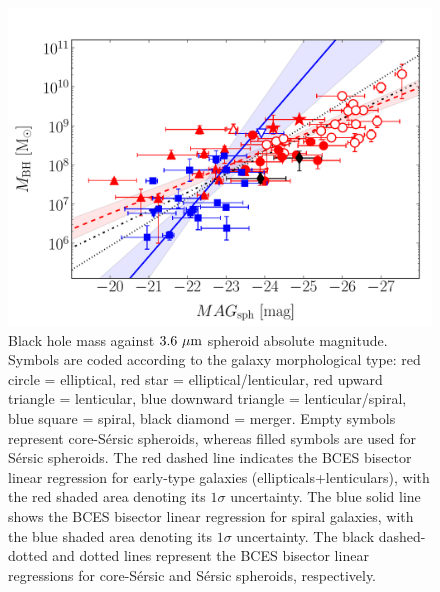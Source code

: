 \documentclass[preprint2]{emulateapj}
\begin{document}




\begin{figure}[h]
\begin{center}
\includegraphics[width=\columnwidth]{images/mbh_vs_mag_sph.pdf}
\caption{Black hole mass against $3.6\rm~\mu m$ spheroid absolute magnitude. 
Symbols are coded according to the galaxy morphological type: red circle = elliptical, red star = elliptical/lenticular, 
red upward triangle = lenticular, blue downward triangle = lenticular/spiral, blue square = spiral, black diamond = merger. 
Empty symbols represent core-S\'ersic spheroids, whereas filled symbols are used for S\'ersic spheroids. 
The red dashed line indicates the BCES bisector linear regression for early-type galaxies (ellipticals+lenticulars), 
with the red shaded area denoting its $1\sigma$ uncertainty. 
The blue solid line shows the BCES bisector linear regression for spiral galaxies, 
with the blue shaded area denoting its $1\sigma$ uncertainty. 
The black dashed-dotted and dotted lines represent the BCES bisector linear regressions for core-S\'ersic and S\'ersic spheroids, respectively.}
\label{fig:mbhmagsph}
\end{center}
\end{figure}
\end{document}
